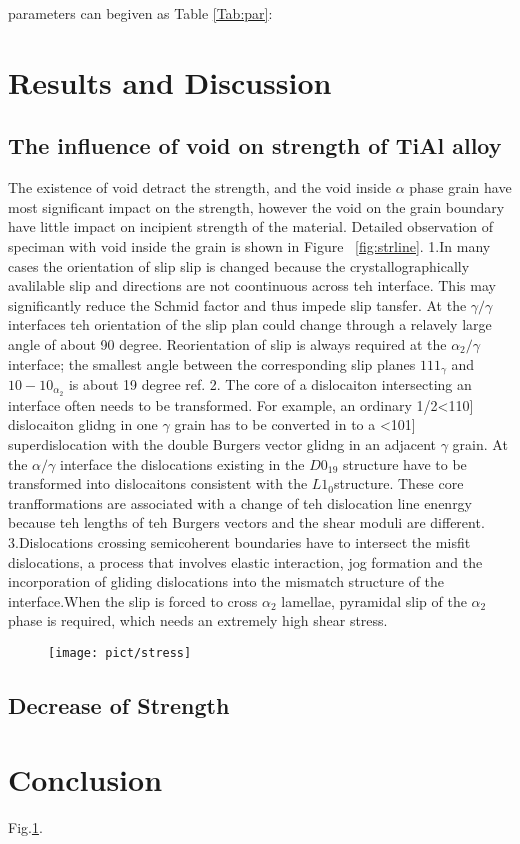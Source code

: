 \documentclass[final,5p,times,twocolumn]{elsarticle}
\begin{document}
parameters can begiven as Table \ref{Tab:par}:



\section{Results and Discussion}

\subsection{The influence of void on strength of TiAl alloy}

The existence of void detract the strength, and the void inside $\alpha$ phase grain have most significant  impact on the strength, however the void on the grain boundary have little impact on incipient strength of the material. Detailed observation of speciman with void inside the grain is shown in Figure ~\ref{fig:strline}.
1.In many cases the orientation of slip slip is changed because the crystallographically avalilable slip and directions are not coontinuous across teh interface. This may significantly reduce the Schmid factor and thus impede slip tansfer. At the $\gamma/\gamma$ interfaces teh orientation of the slip plan could change through a relavely large angle of about 90 degree. Reorientation of slip is always required at the $\alpha_{2} / \gamma$ interface; the smallest angle between the corresponding slip planes ${1 1 1 }_{\gamma}$ and ${ 1 0 -1 0}_{\alpha_2}$ is about 19 degree ref{}.
2. The core of  a dislocaiton intersecting an interface often needs to be transformed. For example, an ordinary 1/2<110] dislocaiton glidng in one $\gamma$ grain has to be converted in to a <101] superdislocation with the double Burgers vector glidng in an adjacent $\gamma$ grain. At the $\alpha/\gamma$ interface the dislocations existing in the $D0_{19}$ structure have to be transformed into dislocaitons consistent with the $L1_0$structure. These core tranfformations are associated with a change of teh dislocation line enenrgy because teh lengths of teh Burgers vectors and the shear moduli are different.
3.Dislocations crossing semicoherent boundaries have to intersect the misfit dislocations, a process that involves elastic interaction, jog formation and the incorporation of gliding dislocations into the mismatch structure of the interface.When the slip is forced to cross $\alpha_2$ lamellae, pyramidal slip of the $\alpha_2$ phase is required, which needs an extremely high shear stress.
\begin{figure}
	\centering
	\texttt{[image: pict/stress]}
	\caption{}
	\centering
	\label{fig:stress}
\end{figure}



\subsection{Decrease of Strength}


\section{Conclusion}





Fig.\ref{fig:stress}.
\end{document}
